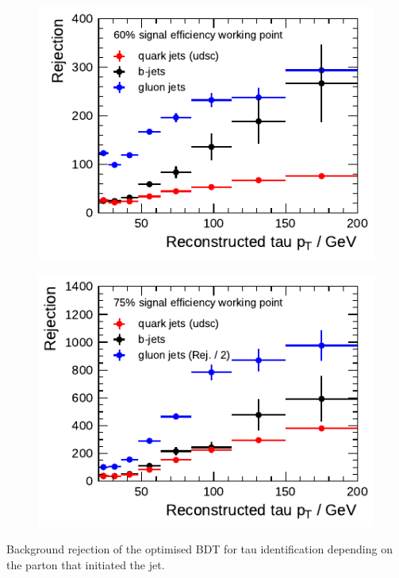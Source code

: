 \noindent
\begin{minipage}{\textwidth}
  \captionsetup{type=figure}
  \centering
  \begin{subfigure}[t]{0.48\textwidth}
    \centering
    \includegraphics{./figures/bdt_perf/parton/truth_parton_1p.pdf}
  \end{subfigure}\hfill
  \begin{subfigure}[t]{0.48\textwidth}
    \centering
    \includegraphics{./figures/bdt_perf/parton/truth_parton_3p.pdf}
  \end{subfigure}
  \caption[Background rejection of the optimised BDT depending on the parton
  initiating the jet ]{Background rejection of the optimised BDT for tau
    identification depending on the parton that initiated the jet.}
\end{minipage}

